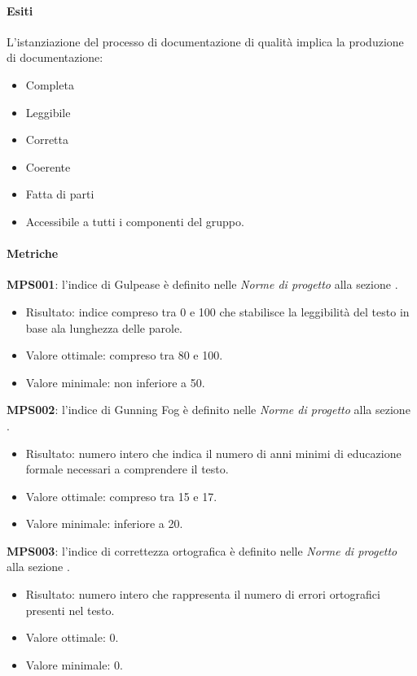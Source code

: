 \documentclass[../piano-di-qualifica.tex]{subfiles}
\begin{document}
\paragraph{Esiti}%
\label{par:esiti}
L'istanziazione del processo di documentazione di qualità implica la produzione di documentazione:
\begin{itemize}
  \item Completa
  \item Leggibile
  \item Corretta
  \item Coerente
  \item Fatta di parti
  \item Accessibile a tutti i componenti del gruppo.
\end{itemize}

\paragraph{Metriche}%
\label{par:metriche}

\textbf{MPS001}: l'indice di Gulpease è definito nelle \textit{Norme di progetto} alla sezione 	.
\begin{itemize}
  \item Risultato: indice compreso tra 0 e 100 che stabilisce la leggibilità del testo in base ala lunghezza delle parole.
  \item Valore ottimale: compreso tra 80 e 100.
  \item Valore minimale: non inferiore a 50.
\end{itemize}

\textbf{MPS002}: l'indice di Gunning Fog è definito nelle \textit{Norme di progetto} alla sezione .
\begin{itemize}
  \item Risultato: numero intero che indica il numero di anni minimi di educazione formale necessari a comprendere il testo.
  \item Valore ottimale: compreso tra 15 e 17.
  \item Valore minimale: inferiore a 20.
\end{itemize}

\textbf{MPS003}: l'indice di correttezza ortografica è definito nelle \textit{Norme di progetto} alla sezione .
\begin{itemize}
  \item Risultato: numero intero che rappresenta il numero di errori ortografici presenti nel testo.
  \item Valore ottimale: 0.
  \item Valore minimale: 0.
\end{itemize}
\end{document}
